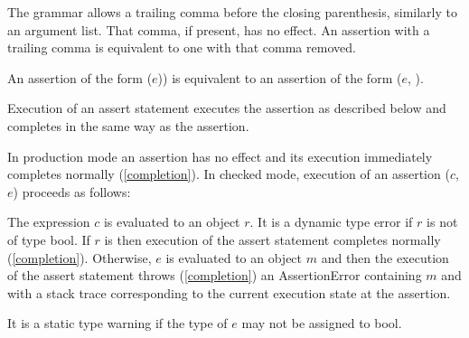 \documentclass{article}
\newcommand{\code}[1]{{\sf #1}}
\begin{document}
\LMHash{}
The grammar allows a trailing comma before the closing parenthesis,
similarly to an argument list. That comma, if present, has no effect.
An assertion with a trailing comma is equivalent to one with that
comma removed.

\LMHash{}
An assertion of the form \code{\ASSERT($e$))} is equivalent to an assertion of the form \code{\ASSERT($e$, \NULL{})}.

\LMHash{}
Execution of an assert statement executes the assertion as described below
and completes in the same way as the assertion.

\LMHash{}
In production mode an assertion has no effect
and its execution immediately completes normally (\ref{completion}).
In checked mode,
execution of an assertion \code{\ASSERT{}($c$, $e$)} proceeds as follows:

\LMHash{}
The expression $c$ is evaluated to an object $r$.
It is a dynamic type error if $r$ is not of type \code{bool}.
If $r$ is \TRUE{} then execution of the assert statement completes normally (\ref{completion}).
Otherwise, $e$ is evaluated to an object $m$
and then the execution of the assert statement throws (\ref{completion}) an \code{AssertionError} containing $m$ and with a stack trace corresponding to the current execution state at the assertion.

\LMHash{}
It is a static type warning if the type of $e$ may not be assigned to \code{bool}.



\end{document}
